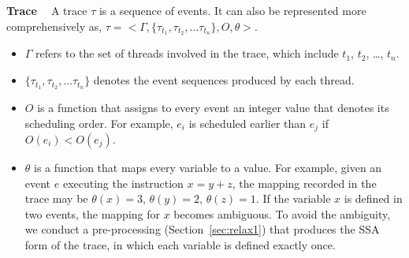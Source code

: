 {\bf Trace \ } A trace $\tau$ is a sequence of events. It can also be represented more comprehensively as,  $\tau=<\Gamma , \{\tau_{t_1}, \tau_{t_2}, \dots \tau_{t_n} \}, O, \theta>$.
\begin{itemize}
\item  $\Gamma$ refers to the set of threads involved in the trace, which include $t_1$, $t_2$, \dots, $t_n$.
\item   $\{\tau_{t_1}, \tau_{t_2}, \dots \tau_{t_n} \}$ denotes the event sequences produced by each thread.  
\item  $O$ is a function that assigns  to every event an integer value that denotes its scheduling order. For example, $e_i$ is scheduled earlier than $e_j$ if $O(e_i)<O(e_j)$.
\item  $\theta$ is a function that maps every variable to a value. For example, given an event $e$ executing the instruction $x=y+z$, the mapping recorded in the trace may be $\theta(x)=3$,  $\theta(y)=2$,  $\theta(z)=1$.  If the variable $x$ is defined in two events, the mapping for $x$ becomes ambiguous. To avoid the ambiguity, we conduct a pre-processing  (Section~\ref{sec:relax1}) that produces the SSA form of the trace, in which each variable is defined exactly once. 
\end{itemize}




